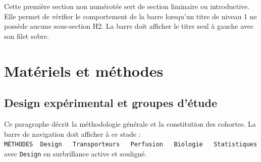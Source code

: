 \documentclass[
  french,
  10pt,
  a4paper,
]{scrartcl}
\begin{document}
Cette première section non numérotée sert de section liminaire ou
introductive. Elle permet de vérifier le comportement de la barre
lorsqu'un titre de niveau 1 ne possède aucune sous-section H2. La barre
doit afficher le titre seul à gauche avec son filet sobre.

\newpage

\clearpage

\section{Matériels et méthodes}\label{matuxe9riels-et-muxe9thodes}



\subsection{Design expérimental et groupes
d'étude}\label{design-expuxe9rimental-et-groupes-duxe9tude}

Ce paragraphe décrit la méthodologie générale et la constitution des
cohortes. La barre de navigation doit afficher à ce stade :
\texttt{MÉTHODES\ \textbar{}\ Design\ \ \ Transporteurs\ \ \ Perfusion\ \ \ Biologie\ \ \ Statistiques}
avec \texttt{Design} en surbrillance active et souligné.

\vspace{5cm}
\end{document}
